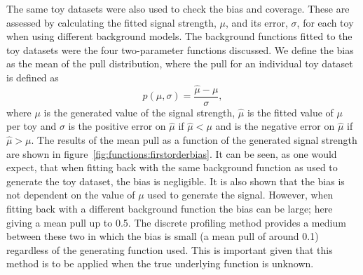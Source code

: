 The same toy datasets were also used to check the bias and coverage.
These are assessed by calculating the fitted signal strength, $\mu$, and its error, $\sigma$, for each toy when using different background models. The background functions fitted to the toy datasets were the four two-parameter functions discussed.
We define the bias as the mean of the pull distribution, where the pull for an individual toy dataset is defined as
\begin{displaymath}
	p(\mu,\sigma) = \frac{\hat{\mu}-\mu}{\sigma},
\end{displaymath}
where $\mu$ is the generated value of the signal strength, $\hat{\mu}$ is the fitted value of $\mu$ per toy and $\sigma$ is the positive error on $\hat{\mu}$ if $\hat{\mu} < \mu$ and is the negative error on $\hat{\mu}$ if $\hat{\mu} > \mu$. The results of the mean pull as a function of the generated signal strength are shown in figure~\ref{fig:functions:firstorderbias}. It can be seen, as one would expect, that when fitting back with the same background function as used to generate the toy dataset, the bias is negligible. It is also shown that the bias is not dependent on the value of $\mu$ used to generate the signal. However, when fitting back with a different background function the bias can be large; here giving a mean pull up to 0.5.
The discrete profiling method provides a medium between these two in which the bias is small (a mean pull of around 0.1) regardless of the generating function used. This is important given that this method is to be applied when the true underlying function is unknown.
%
